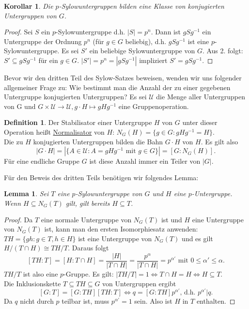 \documentclass[12pt]{scrartcl} %
\newtheorem{lemma}{Lemma}
\newtheorem{kor}{Korollar}
\theoremstyle{definition}
\newtheorem*{defn}{Definition}
\theoremstyle{remark}
\begin{document}
\begin{kor}
	Die $p$-Sylowuntergruppen bilden eine Klasse von konjugierten Untergruppen von $G$.
\end{kor}

\begin{proof}
	Sei $S$ ein $p$-Sylowuntergruppe d.h. $|S| = p^n$. Dann ist $gSg^{-1}$ ein Untergruppe der Ordnung $p^n$ (für $g \in G$ beliebig), d.h. $gSg^{-1}$ ist eine $p$-Sylowuntergruppe. Es sei $S'$ ein beliebige Sylowuntergruppe von $G$. Aus 2. folgt: $S' \subseteq gSg^{-1}$ für ein $g \in G$. $|S'| = p^n = |gSg^{-1}|$ impliziert $S' = gSg^{-1}$.
\end{proof}

Bevor wir den dritten Teil des Sylow-Satzes beweisen, wenden wir uns folgender allgemeiner Frage zu: Wie bestimmt man die Anzahl der zu einer gegebenen Untergruppe konjugierten Untergruppen? Es sei $\mathcal{U}$ die Menge aller Untergruppen von G und $ G \times \mathcal{U} \rightarrow \mathcal{U}, g \cdot H \mapsto gHg^{-1} $ eine Gruppenoperation.

\begin{defn}
	Der Stabilisator einer Untergruppe $H$ von $G$ unter dieser Operation heißt \underline{Normalisator} von $H$: $N_G(H) = \{ g \in G: gHg^{-1} = H \}$. \\
	Die zu $H$ konjugierten Untergruppen bilden die Bahn $G \cdot H$ von $H$. Es gilt also
	$$ |G \cdot H| = | \{ A \in \mathcal{U} : A = gHg^{-1} \text{ mit } g \in G \} | = [G:N_G(H)] .$$
	Für eine endliche Gruppe $G$ ist diese Anzahl immer ein Teiler von $|G|$.
\end{defn}

Für den Beweis des dritten Teils benötigen wir folgendes Lemma:

\begin{lemma}\label{lem:Sylow}
	Sei $T$ eine $p$-Sylowuntergruppe von $G$ und $H$ eine $p$-Untergruppe. Wenn $H \subseteq N_G(T)$ gilt, gilt bereits $H \subseteq T$.
\end{lemma}

\begin{proof}
	Da $T$ eine normale Untergruppe von $N_G(T)$ ist und $H$ eine Untergruppe von $N_G(T)$ ist, kann man den ersten Isomorphiesatz anwenden: $TH = \{ gh : g \in T, h \in H \}$ ist eine Untergruppe von $N_G(T)$ und es gilt $H/(T \cap H) \cong TH/T$. Daraus folgt
	$$ [TH : T] = [H : T \cap H] = \frac{|H|}{|T \cap H|} = \frac{p^{\alpha}}{|T \cap H|} = p^{\alpha '} \text{ mit } 0 \leq \alpha ' \leq \alpha.$$
	$TH/T$ ist also eine $p$-Gruppe. Es gilt: $|TH/T| = 1 \Leftrightarrow T \cap H = H \Leftrightarrow H \subseteq T$. \\
	Die Inklusionskette $T \subseteq TH \subseteq G$ von Untergruppen ergibt
	$$[G:T] = [G:TH][TH:T] \Leftrightarrow q = [G:TH]p^{\alpha '} \text{, d.h. } p^{\alpha '} | q.$$
	Da $q$ nicht durch $p$ teilbar ist, muss $p^{\alpha '} = 1$ sein. Also ist $H$ in $T$ enthalten.
\end{proof}
\end{document}
